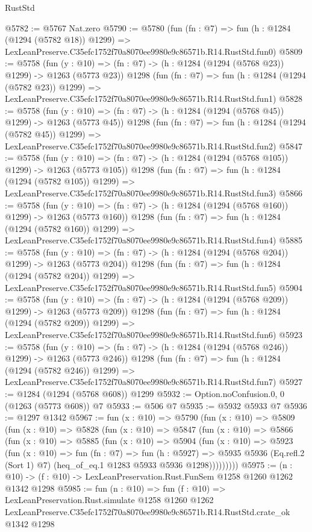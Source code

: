 \begin{lexlean}{RustStd}
\begin{coremodule}
@5782 := @5767 Nat.zero
@5790 := @5780
    (fun (fn : @7) =>
    fun (h : @1284 (@1294 (@5782 @18)) @1299) =>
    LexLeanPreserve.C35efc1752f70a8070ee9980e9c86571b.R14.RustStd.fun0)
@5809 := @5758
    (fun (y : @10) => (fn : @7) -> (h : @1284 (@1294 (@5768 @23)) @1299) -> @1263 (@5773 @23))
    @1298
    (fun (fn : @7) =>
    fun (h : @1284 (@1294 (@5782 @23)) @1299) =>
    LexLeanPreserve.C35efc1752f70a8070ee9980e9c86571b.R14.RustStd.fun1)
@5828 := @5758
    (fun (y : @10) => (fn : @7) -> (h : @1284 (@1294 (@5768 @45)) @1299) -> @1263 (@5773 @45))
    @1298
    (fun (fn : @7) =>
    fun (h : @1284 (@1294 (@5782 @45)) @1299) =>
    LexLeanPreserve.C35efc1752f70a8070ee9980e9c86571b.R14.RustStd.fun2)
@5847 := @5758
    (fun (y : @10) => (fn : @7) -> (h : @1284 (@1294 (@5768 @105)) @1299) -> @1263 (@5773 @105))
    @1298
    (fun (fn : @7) =>
    fun (h : @1284 (@1294 (@5782 @105)) @1299) =>
    LexLeanPreserve.C35efc1752f70a8070ee9980e9c86571b.R14.RustStd.fun3)
@5866 := @5758
    (fun (y : @10) => (fn : @7) -> (h : @1284 (@1294 (@5768 @160)) @1299) -> @1263 (@5773 @160))
    @1298
    (fun (fn : @7) =>
    fun (h : @1284 (@1294 (@5782 @160)) @1299) =>
    LexLeanPreserve.C35efc1752f70a8070ee9980e9c86571b.R14.RustStd.fun4)
@5885 := @5758
    (fun (y : @10) => (fn : @7) -> (h : @1284 (@1294 (@5768 @204)) @1299) -> @1263 (@5773 @204))
    @1298
    (fun (fn : @7) =>
    fun (h : @1284 (@1294 (@5782 @204)) @1299) =>
    LexLeanPreserve.C35efc1752f70a8070ee9980e9c86571b.R14.RustStd.fun5)
@5904 := @5758
    (fun (y : @10) => (fn : @7) -> (h : @1284 (@1294 (@5768 @209)) @1299) -> @1263 (@5773 @209))
    @1298
    (fun (fn : @7) =>
    fun (h : @1284 (@1294 (@5782 @209)) @1299) =>
    LexLeanPreserve.C35efc1752f70a8070ee9980e9c86571b.R14.RustStd.fun6)
@5923 := @5758
    (fun (y : @10) => (fn : @7) -> (h : @1284 (@1294 (@5768 @246)) @1299) -> @1263 (@5773 @246))
    @1298
    (fun (fn : @7) =>
    fun (h : @1284 (@1294 (@5782 @246)) @1299) =>
    LexLeanPreserve.C35efc1752f70a8070ee9980e9c86571b.R14.RustStd.fun7)
@5927 := @1284 (@1294 (@5768 @608)) @1299
@5932 := Option.noConfusion.{0, 0} (@1263 (@5773 @608)) @7
@5933 := @506 @7
@5935 := @5932 @5933 @7
@5936 := @1297 @1342
@5967 := fun (x : @10) =>
  @5790
    (fun (x : @10) =>
    @5809
      (fun (x : @10) =>
      @5828
        (fun (x : @10) =>
        @5847
          (fun (x : @10) =>
          @5866
            (fun (x : @10) =>
            @5885
              (fun (x : @10) =>
              @5904
                (fun (x : @10) =>
                @5923
                  (fun (x : @10) =>
                  fun (fn : @7) =>
                  fun (h : @5927) =>
                  @5935
                    @5936
                    (Eq.refl.{2} (Sort 1) @7)
                    (heq_of_eq.{1} @1283 @5933 @5936 @1298)))))))))
@5975 := (n : @10) -> (f : @10) -> LexLeanPreservation.Rust.FunSem @1258 @1260 @1262 @1342 @1298
@5985 := fun (n : @10) =>
  fun (f : @10) =>
  LexLeanPreservation.Rust.simulate
    @1258
    @1260
    @1262
    LexLeanPreserve.C35efc1752f70a8070ee9980e9c86571b.R14.RustStd.crate_ok
    @1342
    @1298
\end{coremodule}
\end{lexlean}
